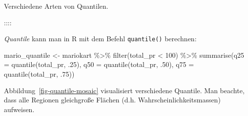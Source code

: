 \documentclass[
  letterpaper,
]{scrbook}
\newenvironment{Shaded}{\begin{snugshade}}{\end{snugshade}}
\newcommand{\AttributeTok}[1]{\textcolor[rgb]{0.40,0.45,0.13}{#1}}
\newcommand{\DecValTok}[1]{\textcolor[rgb]{0.68,0.00,0.00}{#1}}
\newcommand{\FunctionTok}[1]{\textcolor[rgb]{0.28,0.35,0.67}{#1}}
\newcommand{\NormalTok}[1]{\textcolor[rgb]{0.00,0.23,0.31}{#1}}
\newcommand{\OtherTok}[1]{\textcolor[rgb]{0.00,0.23,0.31}{#1}}
\newcommand{\SpecialCharTok}[1]{\textcolor[rgb]{0.37,0.37,0.37}{#1}}
\theoremstyle{definition}
\theoremstyle{definition}
\theoremstyle{definition}
\theoremstyle{remark}
\begin{document}
Verschiedene Arten von Quantilen.

::::

\emph{Quantile} kann man in R mit dem Befehl \texttt{quantile()}
berechnen:

\begin{Shaded}
\begin{Highlighting}[]
\NormalTok{mario\_quantile }\OtherTok{\textless{}{-}} 
\NormalTok{mariokart }\SpecialCharTok{\%\textgreater{}\%} 
  \FunctionTok{filter}\NormalTok{(total\_pr }\SpecialCharTok{\textless{}} \DecValTok{100}\NormalTok{) }\SpecialCharTok{\%\textgreater{}\%} 
  \FunctionTok{summarise}\NormalTok{(}\AttributeTok{q25 =} \FunctionTok{quantile}\NormalTok{(total\_pr, .}\DecValTok{25}\NormalTok{),}
            \AttributeTok{q50 =} \FunctionTok{quantile}\NormalTok{(total\_pr, .}\DecValTok{50}\NormalTok{),}
            \AttributeTok{q75 =} \FunctionTok{quantile}\NormalTok{(total\_pr, .}\DecValTok{75}\NormalTok{))}
\end{Highlighting}
\end{Shaded}

Abbildung~\ref{fig-quantile-mosaic} visualisiert verschiedene Quantile.
Man beachte, dass alle Regionen gleichgroße Flächen (d.h.
Wahrscheinlichkeitsmassen) aufweisen.
\end{document}
